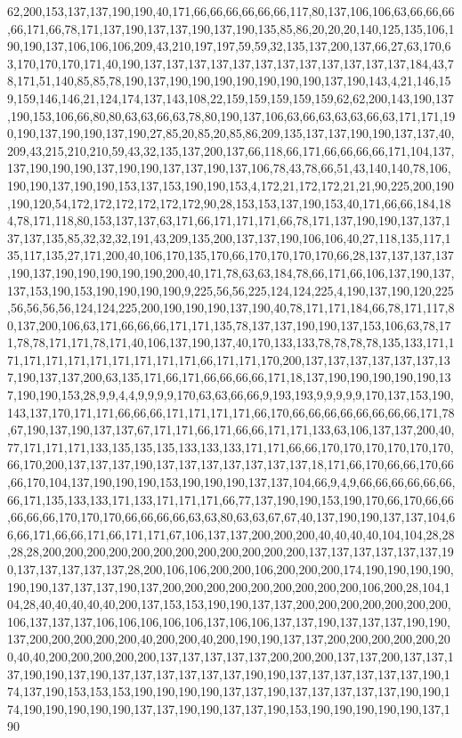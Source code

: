 62,200,153,137,137,190,190,40,171,66,66,66,66,66,66,117,80,137,106,106,63,66,66,66,66,171,66,78,171,137,190,137,137,190,137,190,135,85,86,20,20,20,140,125,135,106,190,190,137,106,106,106,209,43,210,197,197,59,59,32,135,137,200,137,66,27,63,170,63,170,170,170,171,40,190,137,137,137,137,137,137,137,137,137,137,137,137,184,43,78,171,51,140,85,85,78,190,137,190,190,190,190,190,190,190,137,190,143,4,21,146,159,159,146,146,21,124,174,137,143,108,22,159,159,159,159,159,62,62,200,143,190,137,190,153,106,66,80,80,63,63,66,63,78,80,190,137,106,63,66,63,63,63,66,63,171,171,190,190,137,190,190,137,190,27,85,20,85,20,85,86,209,135,137,137,190,190,137,137,40,209,43,215,210,210,59,43,32,135,137,200,137,66,118,66,171,66,66,66,66,171,104,137,137,190,190,190,137,190,190,137,137,190,137,106,78,43,78,66,51,43,140,140,78,106,190,190,137,190,190,153,137,153,190,190,153,4,172,21,172,172,21,21,90,225,200,190,190,120,54,172,172,172,172,172,172,90,28,153,153,137,190,153,40,171,66,66,184,184,78,171,118,80,153,137,137,63,171,66,171,171,171,66,78,171,137,190,190,137,137,137,137,135,85,32,32,32,191,43,209,135,200,137,137,190,106,106,40,27,118,135,117,135,117,135,27,171,200,40,106,170,135,170,66,170,170,170,170,66,28,137,137,137,137,190,137,190,190,190,190,190,200,40,171,78,63,63,184,78,66,171,66,106,137,190,137,137,153,190,153,190,190,190,190,9,225,56,56,225,124,124,225,4,190,137,190,120,225,56,56,56,56,124,124,225,200,190,190,190,137,190,40,78,171,171,184,66,78,171,117,80,137,200,106,63,171,66,66,66,171,171,135,78,137,137,190,190,137,153,106,63,78,171,78,78,171,171,78,171,40,106,137,190,137,40,170,133,133,78,78,78,78,135,133,171,171,171,171,171,171,171,171,171,171,66,171,171,170,200,137,137,137,137,137,137,137,190,137,137,200,63,135,171,66,171,66,66,66,66,171,18,137,190,190,190,190,190,137,190,190,153,28,9,9,4,4,9,9,9,9,170,63,63,66,66,9,193,193,9,9,9,9,9,170,137,153,190,143,137,170,171,171,66,66,66,171,171,171,171,66,170,66,66,66,66,66,66,66,66,171,78,67,190,137,190,137,137,67,171,171,66,171,66,66,171,171,133,63,106,137,137,200,40,77,171,171,171,133,135,135,135,133,133,133,171,171,66,66,170,170,170,170,170,170,66,170,200,137,137,137,190,137,137,137,137,137,137,137,18,171,66,170,66,66,170,66,66,170,104,137,190,190,190,153,190,190,190,137,137,104,66,9,4,9,66,66,66,66,66,66,66,171,135,133,133,171,133,171,171,171,66,77,137,190,190,153,190,170,66,170,66,66,66,66,66,170,170,170,66,66,66,66,63,63,80,63,63,67,67,40,137,190,190,137,137,104,66,66,171,66,66,171,66,171,171,67,106,137,137,200,200,200,40,40,40,40,104,104,28,28,28,28,200,200,200,200,200,200,200,200,200,200,200,200,137,137,137,137,137,137,190,137,137,137,137,137,28,200,106,106,200,200,106,200,200,200,174,190,190,190,190,190,190,137,137,137,190,137,200,200,200,200,200,200,200,200,200,106,200,28,104,104,28,40,40,40,40,40,200,137,153,153,190,190,137,137,200,200,200,200,200,200,200,106,137,137,137,106,106,106,106,106,137,106,106,137,137,190,137,137,137,190,190,137,200,200,200,200,200,40,200,200,40,200,190,190,137,137,200,200,200,200,200,200,40,40,200,200,200,200,200,137,137,137,137,137,200,200,200,137,137,200,137,137,137,190,190,137,190,137,137,137,137,137,137,190,190,137,137,137,137,137,137,190,174,137,190,153,153,153,190,190,190,190,137,137,190,137,137,137,137,137,190,190,174,190,190,190,190,190,137,137,190,190,137,137,190,153,190,190,190,190,190,137,190